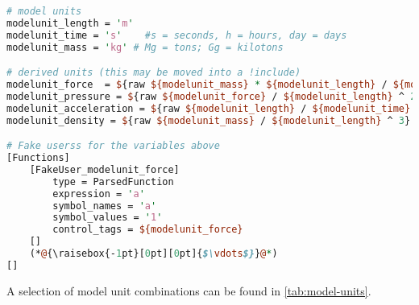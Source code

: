 \begin{lstlisting}[language=perl, caption={Set of consistent physical units in a Moose inut file},label={patterns-physical-unit-set}]
# model units
modelunit_length = 'm'
modelunit_time = 's'    #s = seconds, h = hours, day = days
modelunit_mass = 'kg' # Mg = tons; Gg = kilotons

# derived units (this may be moved into a !include)
modelunit_force  = ${raw ${modelunit_mass} * ${modelunit_length} / ${modelunit_time} ^ 2}
modelunit_pressure = ${raw ${modelunit_force} / ${modelunit_length} ^ 2}
modelunit_acceleration = ${raw ${modelunit_length} / ${modelunit_time} ^ 2}
modelunit_density = ${raw ${modelunit_mass} / ${modelunit_length} ^ 3}

# Fake userss for the variables above
[Functions]
    [FakeUser_modelunit_force]
        type = ParsedFunction
        expression = 'a'
        symbol_names = 'a'
        symbol_values = '1'
        control_tags = ${modelunit_force}
    []
    (*@{\raisebox{-1pt}[0pt][0pt]{$\vdots$}}@*)
[]
\end{lstlisting}

A selection of model unit combinations can be found in
\autoref{tab:model-units}.

